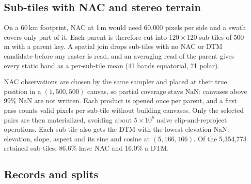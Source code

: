 \subsection{Sub-tiles with NAC and stereo terrain}
\label{sec:level2}

On a 60\,km footprint, NAC at 1\,m would need 60,000 pixels per side and a swath covers only part of it. Each parent is therefore cut into $120\times120$ sub-tiles of 500\,m with a parent key. A spatial join drops sub-tiles with no NAC or DTM candidate before any raster is read, and an averaging read of the parent gives every static band as a per-sub-tile mean (41 bands equatorial, 71 polar).

NAC observations are chosen by the same sampler and placed at their true position in a $(1, 500, 500)$ canvas, so partial coverage stays NaN; canvases above 99\% NaN are not written. Each product is opened once per parent, and a first pass counts valid pixels per sub-tile without building canvases. Only the selected pairs are then materialized, avoiding about $5\times10^8$ naive clip-and-reproject operations. Each sub-tile also gets the DTM with the lowest elevation NaN: elevation, slope, aspect and its sine and cosine at $(5, 166, 166)$. Of the 5,354,773 retained sub-tiles, 86.6\% have NAC and 16.0\% a DTM.

\subsection{Records and splits}
\label{sec:splits}

